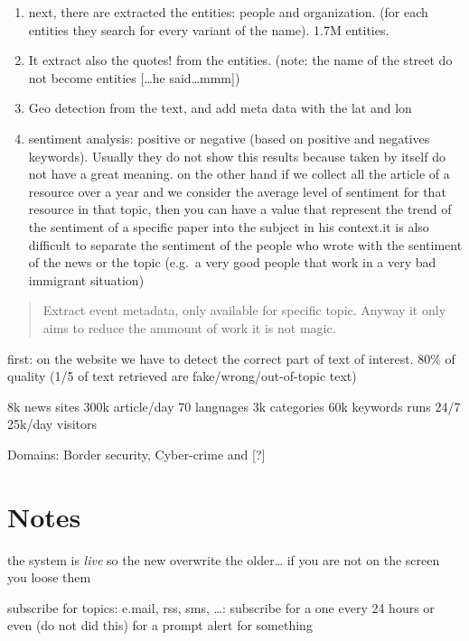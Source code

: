 \documentclass[]{book}
\theoremstyle{definition}
\theoremstyle{definition}
\theoremstyle{definition}
\theoremstyle{remark}
\begin{document}
\begin{enumerate}
\def\labelenumi{\arabic{enumi}.}
\setcounter{enumi}{3}
\item
  next, there are extracted the entities: people and organization. (for
  each entities they search for every variant of the name). 1.7M
  entities.
\item
  It extract also the quotes! from the entities. (note: the name of the
  street do not become entities {[}\ldots{}he said\ldots{}mmm{]})
\item
  Geo detection from the text, and add meta data with the lat and lon
\item
  sentiment analysis: positive or negative (based on positive and
  negatives keywords). Usually they do not show this results because
  taken by itself do not have a great meaning. on the other hand if we
  collect all the article of a resource over a year and we consider the
  average level of sentiment for that resource in that topic, then you
  can have a value that represent the trend of the sentiment of a
  specific paper into the subject in his context.it is also difficult to
  separate the sentiment of the people who wrote with the sentiment of
  the news or the topic (e.g.~a very good people that work in a very bad
  immigrant situation)
\end{enumerate}

\begin{quote}
Extract event metadata, only available for specific topic. Anyway it
only aims to reduce the ammount of work it is not magic.
\end{quote}

first: on the website we have to detect the correct part of text of
interest. 80\% of quality (1/5 of text retrieved are
fake/wrong/out-of-topic text)

8k news sites 300k article/day 70 languages 3k categories 60k keywords
runs 24/7 25k/day visitors

Domains: Border security, Cyber-crime and {[}?{]}

\section{Notes}\label{notes}

the system is \emph{live} so the new overwrite the older\ldots{} if you
are not on the screen you loose them

subscribe for topics: e.mail, rss, sms, \ldots{}: subscribe for a one
every 24 hours or even (do not did this) for a prompt alert for
something
\end{document}
